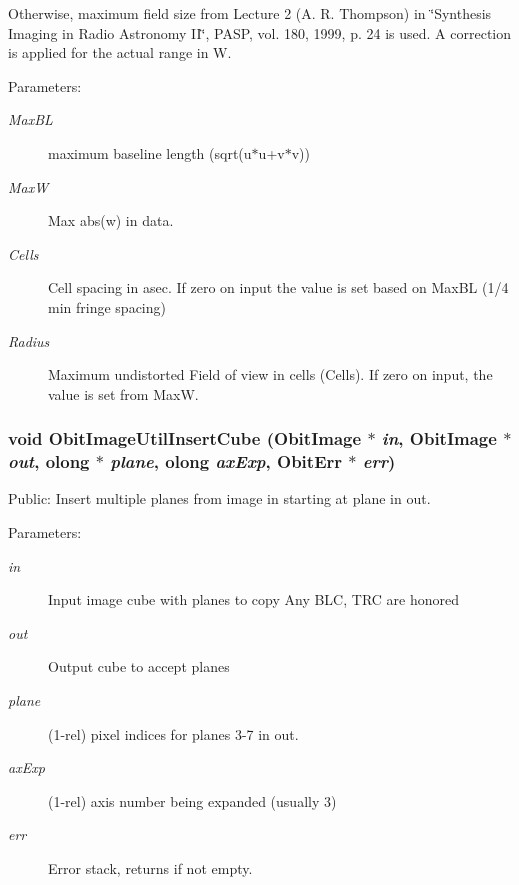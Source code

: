 Otherwise, maximum field size from Lecture 2 (A. R. Thompson) in \char`\"{}Synthesis Imaging in Radio Astronomy II\char`\"{}, PASP, vol. 180, 1999, p. 24 is used. A correction is applied for the actual range in W. \begin{Desc}
\item[Parameters:]
\begin{description}
\item[{\em Max\-BL}]maximum baseline length (sqrt(u$\ast$u+v$\ast$v)) \item[{\em Max\-W}]Max abs(w) in data. \item[{\em Cells}]Cell spacing in asec. If zero on input the value is set based on Max\-BL (1/4 min fringe spacing) \item[{\em Radius}]Maximum undistorted Field of view in cells (Cells). If zero on input, the value is set from Max\-W. \end{description}
\end{Desc}
\subsubsection{\setlength{\rightskip}{0pt plus 5cm}void Obit\-Image\-Util\-Insert\-Cube ({\bf Obit\-Image} $\ast$ {\em in}, {\bf Obit\-Image} $\ast$ {\em out}, {\bf olong} $\ast$ {\em plane}, {\bf olong} {\em ax\-Exp}, {\bf Obit\-Err} $\ast$ {\em err})}\label{ObitImageUtil_8h_a17}


Public: Insert multiple planes from image in starting at plane in out. 

\begin{Desc}
\item[Parameters:]
\begin{description}
\item[{\em in}]Input image cube with planes to copy Any BLC, TRC are honored \item[{\em out}]Output cube to accept planes \item[{\em plane}](1-rel) pixel indices for planes 3-7 in out. \item[{\em ax\-Exp}](1-rel) axis number being expanded (usually 3) \item[{\em err}]Error stack, returns if not empty. \end{description}
\end{Desc}

